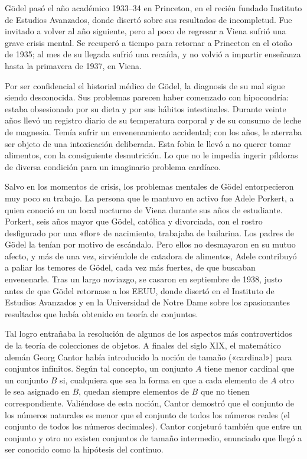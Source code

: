 \documentclass[a4paper, 12pt]{article}
\begin{document}
Gödel pasó el año académico 1933--34 en Princeton, en el recién fundado Instituto de Estudios Avanzados, donde disertó sobre sus resultados de incompletud. Fue invitado a volver al año siguiente, pero al poco de regresar a Viena sufrió una grave crisis mental. Se recuperó a tiempo para retornar a Princeton en el otoño de 1935; al mes de su llegada sufrió una recaída, y no volvió a impartir enseñanza hasta la primavera de 1937, en Viena.

Por ser confidencial el historial médico de Gödel, la diagnosis de su mal sigue siendo desconocida. Sus problemas parecen haber comenzado con hipocondría: estaba obsesionado por su dieta y por sus hábitos intestinales. Durante veinte años llevó un registro diario de su temperatura corporal y de su consumo de leche de magnesia. Temía sufrir un envenenamiento accidental; con los años, le aterraba ser objeto de una intoxicación deliberada. Esta fobia le llevó a no querer tomar alimentos, con la consiguiente desnutrición. Lo que no le impedía ingerir píldoras de diversa condición para un imaginario problema cardíaco.

Salvo en los momentos de crisis, los problemas mentales de Gödel entorpecieron muy poco su trabajo. La persona que le mantuvo en activo fue Adele Porkert, a quien conoció en un local nocturno de Viena durante sus años de estudiante. Porkert, seis años mayor que Gödel, católica y divorciada, con el rostro desfigurado por una «flor» de nacimiento, trabajaba de bailarina. Los padres de Gödel la tenían por motivo de escándalo. Pero ellos no desmayaron en su mutuo afecto, y más de una vez, sirviéndole de catadora de alimentos, Adele contribuyó a paliar los temores de Gödel, cada vez más fuertes, de que buscaban envenenarle. Tras un largo noviazgo, se casaron en septiembre de 1938, justo antes de que Gödel retornase a los EEUU, donde disertó en el Instituto de Estudios Avanzados y en la Universidad de Notre Dame sobre los apasionantes resultados que había obtenido en teoría de conjuntos.

Tal logro entrañaba la resolución de algunos de los aspectos más controvertidos de la teoría de colecciones de objetos. A finales del siglo XIX, el matemático alemán Georg Cantor había introducido la noción de tamaño («cardinal») para conjuntos infinitos. Según tal concepto, un conjunto $A$ tiene menor cardinal que un conjunto $B$ si, cualquiera que sea la forma en que a cada elemento de $A$ otro le sea asignado en $B$, quedan siempre elementos de $B$ que no tienen correspondiente. Valiéndose de esta noción, Cantor demostró que el conjunto de los números naturales es menor que el conjunto de todos los números reales (el conjunto de todos los números decimales). Cantor conjeturó también que entre un conjunto y otro no existen conjuntos de tamaño intermedio, enunciado que llegó a ser conocido como la hipótesis del continuo.
\end{document}

